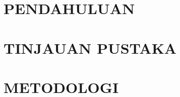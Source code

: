 \documentclass{file/TA-ITS}
\begin{document}


\BagianAwal
\LembarJudul
\TitlePage
\LembarPengesahan

\DaftarIsi\raggedbottom
\DaftarGambar
\DaftarTabel
\DaftarSimbol

\BagianInti
\chapter{PENDAHULUAN}

\pagebreak
\chapter{TINJAUAN PUSTAKA}

\pagebreak
\chapter{METODOLOGI}

\pagebreak
\DaftarPustaka
\end{document}
